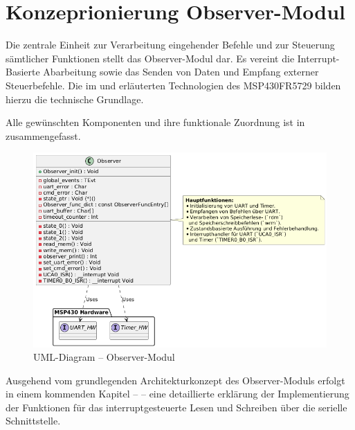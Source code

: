 
\newpage
\section{Konzeprionierung Observer-Modul}
\label{sec:ObserverModulKonzept}

Die zentrale Einheit zur Verarbeitung eingehender Befehle und zur Steuerung s\"amtlicher Funktionen stellt das Observer-Modul dar. Es vereint die Interrupt-Basierte Abarbeitung sowie das Senden von Daten und Empfang externer Steuerbefehle. Die im  und  erl\"auterten Technologien des MSP430FR5729 bilden hierzu die technische Grundlage.

Alle gew\"unschten Komponenten und ihre funktionale Zuordnung ist in  zusammengefasst.

\begin{figure}[h!]
	\centering
	\includegraphics[width=1.0\textwidth]{../Bilder/observer_class_diagram.png}
	\caption{UML-Diagram -- Observer-Modul}
	\label{fig:UmlDiagram_ObserverModul}
\end{figure}

Ausgehend vom grundlegenden Architekturkonzept des Observer-Moduls erfolgt in einem kommenden Kapitel --  -- eine detaillierte erkl\"arung der Implementierung der Funktionen f\"ur das interruptgesteuerte Lesen und Schreiben \"uber die serielle Schnittstelle.


